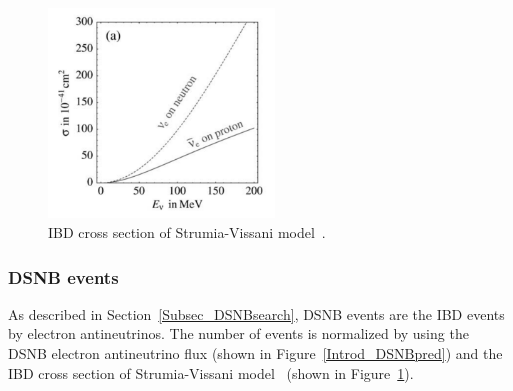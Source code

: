 \begin{figure}[H]
	\centering
	\includegraphics[width=6cm]{Figures/Simulation/IBD_XS}
	\caption[IBD cross section of Strumia-Vissani model]{
	IBD cross section of Strumia-Vissani model~\cite{2003Strumia}.
	}\label{IBD_XS}
\end{figure}

\subsubsection{DSNB events}
\vs\hs
As described in Section~\ref{Subsec_DSNBsearch}, DSNB events are the IBD events by electron antineutrinos.
The number of events is normalized by using the DSNB electron antineutrino flux (shown in Figure~\ref{Introd_DSNBpred}) and the IBD cross section of Strumia-Vissani model~\cite{2003Strumia} (shown in Figure~\ref{IBD_XS}).





